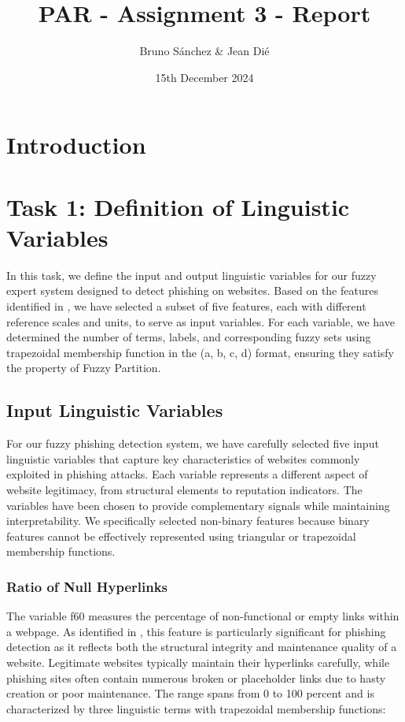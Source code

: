 \documentclass{article}
\begin{document}
\title{PAR - Assignment 3 - Report}
\author{\normalsize Bruno Sánchez \& Jean Dié}
\date{\small 15th December 2024}

\maketitle

\newpage
\tableofcontents
\newpage

\section{Introduction}


\section{Task 1: Definition of Linguistic Variables}\label{sec:task1}

In this task, we define the input and output linguistic variables for our fuzzy expert system designed to detect phishing on websites. Based on the features identified in \cite{Hannousse2020-eq}, we have selected a subset of five features, each with different reference scales and units, to serve as input variables. For each variable, we have determined the number of terms, labels, and corresponding fuzzy sets using trapezoidal membership function in the (a, b, c, d) format, ensuring they satisfy the property of Fuzzy Partition.


\subsection{Input Linguistic Variables}

For our fuzzy phishing detection system, we have carefully selected five input linguistic variables that capture key characteristics of websites commonly exploited in phishing attacks. Each variable represents a different aspect of website legitimacy, from structural elements to reputation indicators. The variables have been chosen to provide complementary signals while maintaining interpretability. We specifically selected non-binary features because binary features cannot be effectively represented using triangular or trapezoidal membership functions.

\subsubsection{Ratio of Null Hyperlinks}
The variable f60 measures the percentage of non-functional or empty links within a webpage. As identified in \cite{Hannousse2020-eq}, this feature is particularly significant for phishing detection as it reflects both the structural integrity and maintenance quality of a website. Legitimate websites typically maintain their hyperlinks carefully, while phishing sites often contain numerous broken or placeholder links due to hasty creation or poor maintenance. The range spans from 0 to 100 percent and is characterized by three linguistic terms with trapezoidal membership functions:
\end{document}
